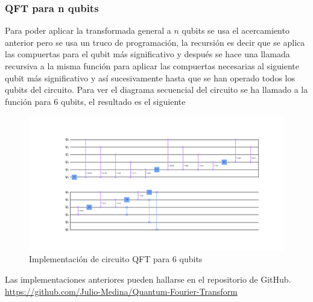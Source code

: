 \documentclass[a4paper]{article}
\begin{document}
\subsubsection{QFT para n qubits}
Para poder aplicar la transformada general a $n$ qubits se usa el acercamiento anterior pero se usa un truco de programación, la recursión es decir que se aplica las compuertas para el qubit más significativo y después se hace una llamada recursiva a la misma función para aplicar las compuertas necesarias al siguiente qubit más significativo y así sucesivamente hasta que se han operado todos los qubits del circuito. Para ver el diagrama secuencial del circuito se ha llamado a la función para $6$ qubits, el resultado es el siguiente\\

\begin{figure}[h]
\includegraphics[scale=0.5, center]{./qft_6_qubits.png} 
\caption{Implementación de circuito QFT para 6 qubits}
\label{fig::QFT_circuit}
\end{figure}
Las implementaciones anteriores pueden hallarse en el repositorio de GitHub. \url{https://github.com/Julio-Medina/Quantum-Fourier-Transform}
\end{document}
